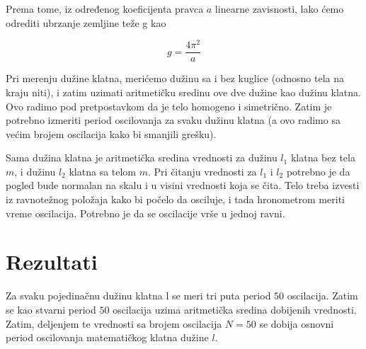 \documentclass[a4paper]{article}
\begin{document}
Prema tome, iz određenog koeficijenta pravca $a$ linearne zavisnosti, lako ćemo odrediti ubrzanje zemljine teže g kao

\begin{equation}
    \label{eq:gravitacija}
    g = \frac{4 \pi^2}{a}
\end{equation}

Pri merenju dužine klatna, merićemo dužinu sa i bez kuglice (odnosno tela na kraju niti), i zatim uzimati aritmetičku sredinu ove dve dužine kao dužinu klatna. Ovo radimo pod pretpostavkom da je telo homogeno i simetrično. Zatim je potrebno izmeriti period oscilovanja za svaku dužinu klatna (a ovo radimo sa većim brojem oscilacija kako bi smanjili grešku).

Sama dužina klatna je aritmetička sredina vrednosti za dužinu $l_1$ klatna bez tela $m$, i dužinu $l_2$ klatna sa telom $m$. Pri čitanju vrednosti za $l_1$ i $l_2$ potrebno je da pogled bude normalan na skalu i u visini vrednosti koja se čita. Telo treba izvesti iz ravnotežnog položaja kako bi počelo da osciluje, i tada hronometrom meriti vreme oscilacija. Potrebno je da se oscilacije vrše u jednoj ravni.

\section{Rezultati}

Za svaku pojedinačnu dužinu klatna l se meri tri puta period $50$ oscilacija. Zatim se kao stvarni period $50$ oscilacija uzima aritmetička sredina dobijenih vrednosti. Zatim, deljenjem te vrednosti sa brojem oscilacija $N = 50$ se dobija osnovni period oscilovanja matematičkog klatna dužine $l$.
\end{document}
